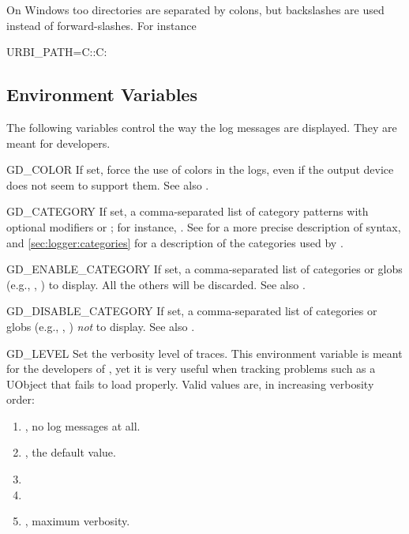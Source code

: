 \begin{windows}
  On Windows too directories are separated by colons, but backslashes
  are used instead of forward-slashes.  For instance
\begin{shell}
URBI_PATH=C:\cygwin\home\jessie\urbi:C:\cygwin\usr\local\urbi
\end{shell}
\end{windows}

\subsection{Environment Variables}
\label{sec:tools:env}

The following variables control the way the log messages are displayed.
They are meant for developers.
\begin{envs}
\item[GD\_COLOR] If set, force the use of colors in the logs, even if the
  output device does not seem to support them.  See also
  .
\item[GD\_CATEGORY] If set, a comma-separated list of category patterns with
  optional modifiers \samp{+} or \samp{-}; for instance,
  .  See  for a more precise
  description of syntax, and \autoref{sec:logger:categories} for a
  description of the categories used by \usdk.

\item[GD\_ENABLE\_CATEGORY] If set, a comma-separated list of categories or
  globs (e.g., , ) to display.  All the others
  will be discarded.  See also .
\item[GD\_DISABLE\_CATEGORY] If set, a comma-separated list of categories or
  globs (e.g., , ) \emph{not} to display.  See
  also .
\item[GD\_LEVEL] Set the verbosity level of traces.  This environment
  variable is meant for the developers of \usdk, yet it is very useful
  when tracking problems such as a UObject that fails to load properly.
  Valid values are, in increasing verbosity order:
  \begin{enumerate}
  \item {}, no log messages at all.
  \item {}, the default value.
  \item {}
  \item {}
  \item {}, maximum verbosity.
  \end{enumerate}


\end{envs}
